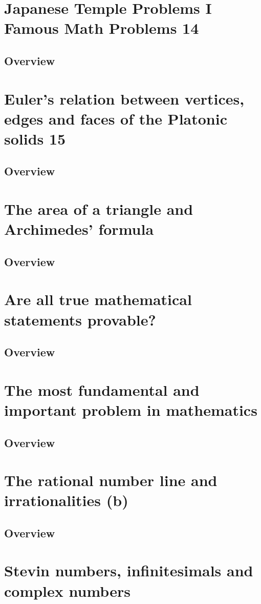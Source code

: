 \documentclass{article}
\begin{document}
\section{Japanese Temple Problems I Famous Math Problems 14}
\subsection{Overview}%
\label{sub:Overview}
\section{Euler's relation between vertices, edges and faces of the Platonic solids 15}
\subsection{Overview}%
\label{sub:Overview}
\section{The area of a triangle and Archimedes' formula}
\subsection{Overview}%
\label{sub:Overview}
\section{Are all true mathematical statements provable?}
\subsection{Overview}%
\label{sub:Overview}
\section{The most fundamental and important problem in mathematics}
\subsection{Overview}%
\label{sub:Overview}
\section{The rational number line and irrationalities (b)}
\subsection{Overview}%
\label{sub:Overview}
\section{Stevin numbers, infinitesimals and complex numbers}
\end{document}
